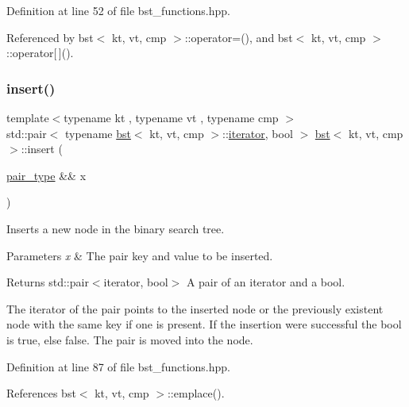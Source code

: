 Definition at line 52 of file bst\+\_\+functions.\+hpp.



Referenced by bst$<$ kt, vt, cmp $>$\+::operator=(), and bst$<$ kt, vt, cmp $>$\+::operator\mbox{[}$\,$\mbox{]}().

\mbox{\label{classbst_aafe95673b19139abd52e242e5d72b66d}} 
\subsubsection{\texorpdfstring{insert()}{insert()}\hspace{0.1cm}{\footnotesize\ttfamily [2/2]}}
{\footnotesize\ttfamily template$<$typename kt , typename vt , typename cmp $>$ \\
std\+::pair$<$ typename \hyperlink{classbst}{bst}$<$ kt, vt, cmp $>$\+::\hyperlink{classbst_a429b0445783ff6486882db5dee900ce0}{iterator}, bool $>$ \hyperlink{classbst}{bst}$<$ kt, vt, cmp $>$\+::insert (\begin{DoxyParamCaption}\item[{\hyperlink{classbst_a7b11cca2a3b4394915600194f741ab16}{pair\+\_\+type} \&\&}]{x }\end{DoxyParamCaption})\hspace{0.3cm}{\ttfamily [noexcept]}}



Inserts a new node in the binary search tree. 


\begin{DoxyParams}{Parameters}
{\em x} & The pair key and value to be inserted. \\
\hline
\end{DoxyParams}
\begin{DoxyReturn}{Returns}
std\+::pair$<$iterator, bool$>$ A pair of an iterator and a bool.
\end{DoxyReturn}
The iterator of the pair points to the inserted node or the previously existent node with the same key if one is present. If the insertion were successful the bool is true, else false. The pair is moved into the node. 

Definition at line 87 of file bst\+\_\+functions.\+hpp.



References bst$<$ kt, vt, cmp $>$\+::emplace().

\mbox{\label{classbst_a962fce8c5811b3bab57d298b6752481f}} 
